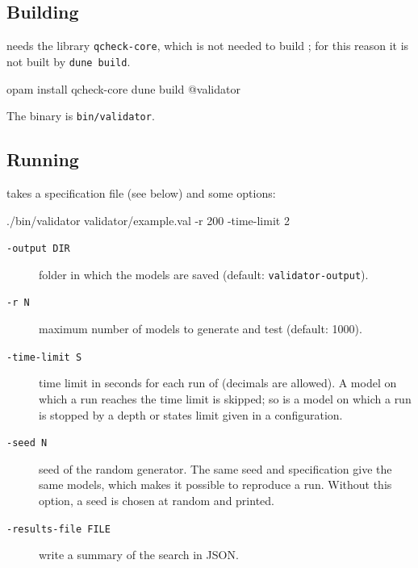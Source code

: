 \subsection{Building}

\validator{} needs the library \texttt{qcheck-core}, which is not needed to build \imitator{}; for this reason it is not built by \texttt{dune build}.

\begin{terminal}
opam install qcheck-core
dune build @validator
\end{terminal}

\noindent{}The binary is \texttt{bin/validator}.

\subsection{Running}

\validator{} takes a specification file (see below) and some options:

\begin{terminal}
./bin/validator validator/example.val -r 200 -time-limit 2
\end{terminal}

\begin{description}
	\item[\texttt{-output DIR}] folder in which the models are saved (default: \texttt{validator-output}).
	\item[\texttt{-r N}] maximum number of models to generate and test (default: 1000).
	\item[\texttt{-time-limit S}] time limit in seconds for each run of \imitator{} (decimals are allowed). A model on which a run reaches the time limit is skipped; so is a model on which a run is stopped by a depth or states limit given in a configuration.
	\item[\texttt{-seed N}] seed of the random generator. The same seed and specification give the same models, which makes it possible to reproduce a run. Without this option, a seed is chosen at random and printed.
	\item[\texttt{-results-file FILE}] write a summary of the search in JSON.
\end{description}

